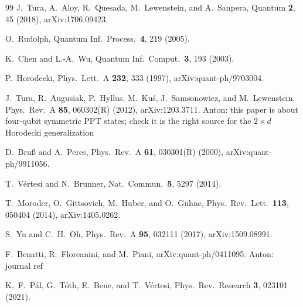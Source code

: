 \documentclass[aps,pra,twocolumn,superscriptaddress,groupedaddress]{revtex4-2}
\newcommand{\anton}[1]{{\color{antongreen} Anton: #1}}
\begin{document}
\begin{thebibliography}{99}
 J.~Tura, A.~Aloy, R.~Quesada, M.~Lewenstein, and
A.~Sanpera, Quantum \textbf{2}, 45 (2018), arXiv:1706.09423.

 O.~Rudolph, Quantum Inf.\ Process.\ \textbf{4}, 219
(2005).

 K.~Chen and L.-A.~Wu, Quantum Inf.\ Comput.\ \textbf{3},
193 (2003).

 P.~Horodecki, Phys.\ Lett.\ A \textbf{232}, 333
(1997), arXiv:quant-ph/9703004.

 J.~Tura, R.~Augusiak, P.~Hyllus, M.~Ku\'s, J.~Samsonowicz,
and M.~Lewenstein, Phys.\ Rev.\ A \textbf{85}, 060302(R) (2012),
arXiv:1203.3711. \anton{this paper is about four-qubit symmetric PPT states;
check it is the right source for the $2\times d$ Horodecki generalization}

 D.~Bru\ss{} and A.~Peres, Phys.\ Rev.\ A \textbf{61},
030301(R) (2000), arXiv:quant-ph/9911056.

 T.~V\'ertesi and N.~Brunner, Nat.\ Commun.\ \textbf{5},
5297 (2014).

 T.~Moroder, O.~Gittsovich, M.~Huber, and O.~G\"{u}hne,
Phys.\ Rev.\ Lett.\ \textbf{113}, 050404 (2014), arXiv:1405.0262.

 S.~Yu and C.~H.~Oh, Phys.\ Rev.\ A \textbf{95}, 032111
(2017), arXiv:1509.08991.

 F.~Benatti, R.~Floreanini, and M.~Piani,
arXiv:quant-ph/0411095. \anton{journal ref}

 K.~F.~P\'al, G.~T\'oth, E.~Bene, and T.~V\'ertesi,
Phys.\ Rev.\ Research \textbf{3}, 023101 (2021).

\end{thebibliography}
\end{document}
